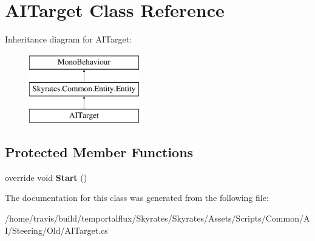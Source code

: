 \hypertarget{class_a_i_target}{\section{A\-I\-Target Class Reference}
\label{class_a_i_target}
}
Inheritance diagram for A\-I\-Target\-:\begin{figure}[H]
\begin{center}
\leavevmode
\includegraphics[height=3.000000cm]{class_a_i_target}
\end{center}
\end{figure}
\subsection*{Protected Member Functions}
\begin{DoxyCompactItemize}
\item 
\hypertarget{class_a_i_target_afa710ee550b6841bdfdf4a593d97a123}{override void {\bfseries Start} ()}\label{class_a_i_target_afa710ee550b6841bdfdf4a593d97a123}

\end{DoxyCompactItemize}


The documentation for this class was generated from the following file\-:\begin{DoxyCompactItemize}
\item 
/home/travis/build/temportalflux/\-Skyrates/\-Skyrates/\-Assets/\-Scripts/\-Common/\-A\-I/\-Steering/\-Old/A\-I\-Target.\-cs\end{DoxyCompactItemize}
